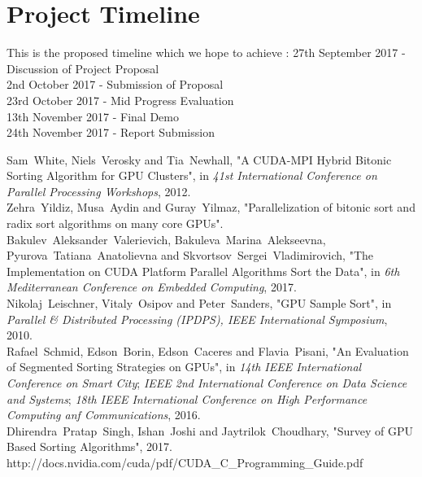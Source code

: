 \documentclass[conference]{IEEEtran}
\begin{document}
\section{Project Timeline }
This is the proposed timeline which we hope to achieve : 
27th September 2017 - Discussion of Project Proposal\\
2nd October 2017 - Submission of Proposal\\
23rd October 2017 - Mid Progress Evaluation\\
13th November 2017 - Final Demo\\
24th November 2017 - Report Submission\\

\begin{thebibliography}{1}

Sam~White, Niels~Verosky and Tia~Newhall, "A CUDA-MPI Hybrid Bitonic Sorting Algorithm for GPU Clusters", in \emph{41st International Conference on Parallel Processing Workshops}, 2012.
\\
Zehra~Yildiz, Musa~Aydin and Guray~Yilmaz, "Parallelization of bitonic sort and radix sort algorithms on many core GPUs".
\\
Bakulev~Aleksander~Valerievich, Bakuleva~Marina~Alekseevna, Pyurova~Tatiana~Anatolievna and Skvortsov~Sergei~Vladimirovich, "The Implementation on CUDA Platform Parallel
Algorithms Sort the Data", in \emph{6th Mediterranean Conference on Embedded Computing}, 2017.
\\
Nikolaj~Leischner, Vitaly~Osipov and Peter~Sanders, "GPU Sample Sort", in \emph{Parallel \& Distributed Processing (IPDPS), IEEE
International Symposium}, 2010.
\\
Rafael~Schmid, Edson~Borin, Edson~Caceres and Flavia~Pisani, "An Evaluation of Segmented Sorting Strategies on GPUs", in \emph{14th IEEE International Conference on Smart City}; \emph{IEEE 2nd International Conference on Data Science and Systems}; \emph{18th IEEE International Conference on High Performance Computing anf Communications}, 2016.
\\
Dhirendra~Pratap~Singh, Ishan~Joshi and Jaytrilok~Choudhary, "Survey of GPU Based Sorting Algorithms", 2017.
\\
http://docs.nvidia.com/cuda/pdf/CUDA\_C\_Programming\_Guide.pdf

\end{thebibliography}
\end{document}
